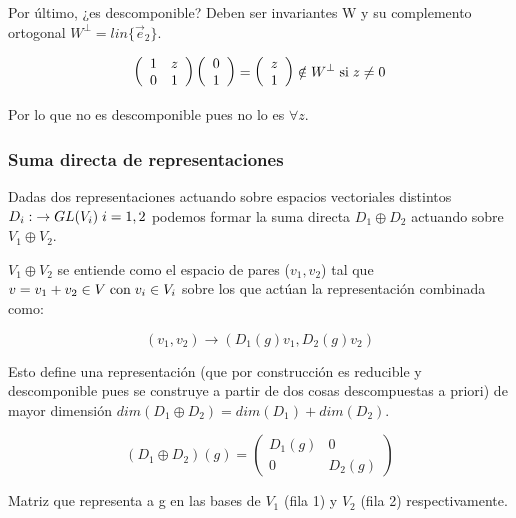 \documentclass{article}
\begin{document}
\smallskip
Por último, ¿es descomponible? Deben ser invariantes W y su complemento ortogonal $W^\bot =lin \lbrace \Vec{e}_2 \rbrace$.

$$\left ( \begin{array}{cc}
1 & z \\
0 & 1
\end{array}\right) \left( \begin{array}{c}
0  \\
1
\end{array}\right)=  \left( \begin{array}{c}
z  \\
1
\end{array}\right) \notin W^\bot \hspace{0.1cm} \text{si} \hspace{0.1cm} z\neq 0$$


Por lo que no es descomponible pues no lo es $\forall z$.

\newpage
\subsubsection{Suma directa de representaciones}

Dadas dos representaciones actuando sobre espacios vectoriales distintos $D_i: \hspace{0.1cm} \to GL(V_i)\hspace{0.1cm} i=1,2$ podemos formar la suma directa $D_1\oplus D_2$ actuando sobre $V_1 \oplus V_2$.

$V_1 \oplus V_2$ se entiende como el espacio de pares ($v_1,v_2$) tal que $v=v_1+v_2 \in V \hspace{0.1cm} \text{con} \hspace{0.1cm} v_i\in V_i$ sobre los que actúan la representación combinada como:

$$(v_1,v_2)\to (D_1(g)v_1,D_2(g)v_2)$$

Esto define una representación (que por construcción es reducible y descomponible pues se construye a partir de dos cosas descompuestas a priori) de mayor dimensión $dim (D_1\oplus D_2)=dim (D_1)+dim (D_2)$.

$$(D_1 \oplus D_2)(g)=\left (\begin{array}{cc}
D_1(g) & 0 \\
0 & D_2(g)
\end{array} \right)$$

Matriz que representa a g en las bases de $V_1$ (fila 1) y $V_2$ (fila 2) respectivamente.
\end{document}
